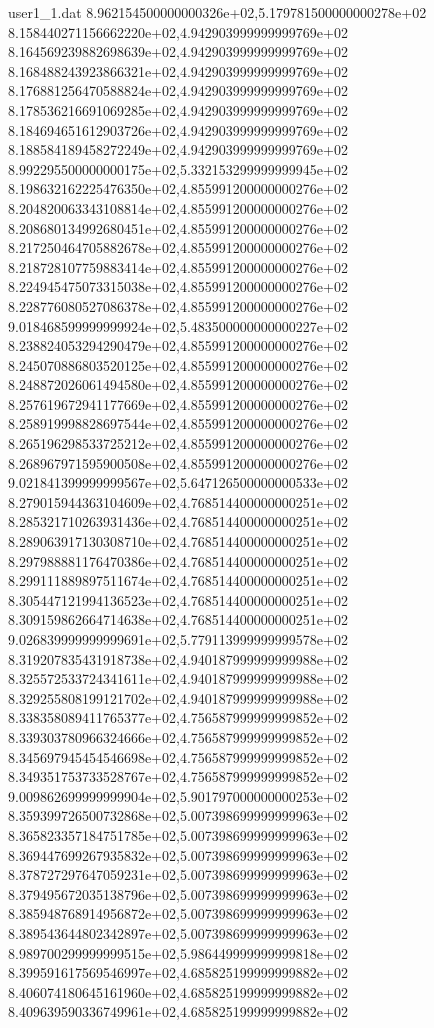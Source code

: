 \begin{filecontents}{user1_1.dat}
8.962154500000000326e+02,5.179781500000000278e+02
8.158440271156662220e+02,4.942903999999999769e+02
8.164569239882698639e+02,4.942903999999999769e+02
8.168488243923866321e+02,4.942903999999999769e+02
8.176881256470588824e+02,4.942903999999999769e+02
8.178536216691069285e+02,4.942903999999999769e+02
8.184694651612903726e+02,4.942903999999999769e+02
8.188584189458272249e+02,4.942903999999999769e+02
8.992295500000000175e+02,5.332153299999999945e+02
8.198632162225476350e+02,4.855991200000000276e+02
8.204820063343108814e+02,4.855991200000000276e+02
8.208680134992680451e+02,4.855991200000000276e+02
8.217250464705882678e+02,4.855991200000000276e+02
8.218728107759883414e+02,4.855991200000000276e+02
8.224945475073315038e+02,4.855991200000000276e+02
8.228776080527086378e+02,4.855991200000000276e+02
9.018468599999999924e+02,5.483500000000000227e+02
8.238824053294290479e+02,4.855991200000000276e+02
8.245070886803520125e+02,4.855991200000000276e+02
8.248872026061494580e+02,4.855991200000000276e+02
8.257619672941177669e+02,4.855991200000000276e+02
8.258919998828697544e+02,4.855991200000000276e+02
8.265196298533725212e+02,4.855991200000000276e+02
8.268967971595900508e+02,4.855991200000000276e+02
9.021841399999999567e+02,5.647126500000000533e+02
8.279015944363104609e+02,4.768514400000000251e+02
8.285321710263931436e+02,4.768514400000000251e+02
8.289063917130308710e+02,4.768514400000000251e+02
8.297988881176470386e+02,4.768514400000000251e+02
8.299111889897511674e+02,4.768514400000000251e+02
8.305447121994136523e+02,4.768514400000000251e+02
8.309159862664714638e+02,4.768514400000000251e+02
9.026839999999999691e+02,5.779113999999999578e+02
8.319207835431918738e+02,4.940187999999999988e+02
8.325572533724341611e+02,4.940187999999999988e+02
8.329255808199121702e+02,4.940187999999999988e+02
8.338358089411765377e+02,4.756587999999999852e+02
8.339303780966324666e+02,4.756587999999999852e+02
8.345697945454546698e+02,4.756587999999999852e+02
8.349351753733528767e+02,4.756587999999999852e+02
9.009862699999999904e+02,5.901797000000000253e+02
8.359399726500732868e+02,5.007398699999999963e+02
8.365823357184751785e+02,5.007398699999999963e+02
8.369447699267935832e+02,5.007398699999999963e+02
8.378727297647059231e+02,5.007398699999999963e+02
8.379495672035138796e+02,5.007398699999999963e+02
8.385948768914956872e+02,5.007398699999999963e+02
8.389543644802342897e+02,5.007398699999999963e+02
8.989700299999999515e+02,5.986449999999999818e+02
8.399591617569546997e+02,4.685825199999999882e+02
8.406074180645161960e+02,4.685825199999999882e+02
8.409639590336749961e+02,4.685825199999999882e+02

\end{filecontents}
